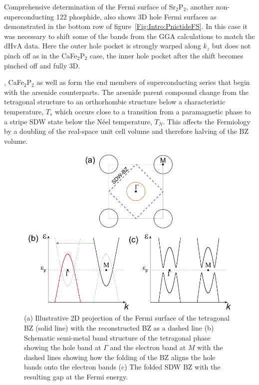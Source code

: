 Comprehensive determination of the Fermi surface of Sr$_2$P$_2$, another non-superconducting 122 phosphide, also shows 3D hole Fermi surfaces as demonstrated in the bottom row of figure~\ref{Fig:Intro:PnictideFS}. In this case it was necessary to shift some of the bands from the \ac{GGA} calculations to match the \ac{dHvA} data. Here the outer hole pocket is strongly warped along $k_z$ but does not pinch off as in the CaFe$_2$P$_2$ case, the inner hole pocket after the shift becomes pinched off and fully 3D.

\SrFeP, CaFe$_2$P$_2$ as well as \BaFeP{} form the end members of superconducting series that begin with the arsenide counterparts. The arsenide parent compound change from the tetragonal structure to an orthorhombic structure below a characteristic temperature, $T_s$ which occurs close to a transition from a paramagnetic phase to a stripe \ac{SDW} state below the N\'eel temperature, $T_N$. This affects the Fermiology by a doubling of the real-space unit cell volume and therefore halving of the \ac{BZ} volume.
\begin{figure}[htbp]
    \begin{center}
        \includegraphics[scale=0.7]{Chapter-Introduction/Figures/AsReconstruction/AsReconstruction}
        \caption{(a) Illustrative 2D projection of the Fermi surface of the tetragonal \ac{BZ} (solid line) with the reconstructed \ac{BZ} as a dashed line (b) Schematic semi-metal band structure of the tetragonal phase showing the hole band at $\Gamma$ and the electron band at $M$ with the dashed lines showing how the folding of the \ac{BZ} aligns the hole bands onto the electron bands (c) The folded \ac{SDW} \ac{BZ} with the resulting gap at the Fermi energy.}
        \label{Fig:Intro:AsReconstruction}
    \end{center}
\end{figure}
